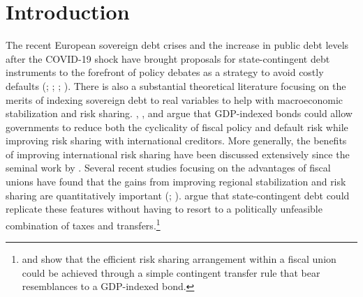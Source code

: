 \ifdefined\ungated
\else
	\def\ungated{1}
\fi

\ifnum{}%
\else
  \section{Introduction}
\fi

The recent European sovereign debt crises and the increase in public debt levels after the COVID-19 shock have brought proposals for state-contingent debt instruments to the forefront of policy debates as a strategy to avoid costly defaults (\citealp{UN2006}; \citealp{Blanchard2016}; \citealp{IMFpolicy2017}; \citealp{IMF2020}). There is also a substantial theoretical literature focusing on the merits of indexing sovereign debt to real variables to help with macroeconomic stabilization and risk sharing. \cite{Shillerbook}, \cite{HMindexed2012}, \citet*{voxeubook} and \cite{KimOstry2021} argue that GDP-indexed bonds could allow governments to reduce both the cyclicality of fiscal policy and default risk while improving risk sharing with international creditors. More generally, the benefits of improving international risk sharing have been discussed extensively since the seminal work by \cite{BackusKehoeKydland92}. Several recent studies focusing on the advantages of fiscal unions have found that the gains from improving regional stabilization and risk sharing are quantitatively important (\citealp{Beraja2020}; \citealp{FarhiWerning2017}). \cite{ObstfeldPeri1998} argue that state-contingent debt could replicate these features without having to resort to a politically unfeasible combination of taxes and transfers.\footnote{\cite{Beraja2020} and \cite{FarhiWerning2017} show that the efficient risk sharing arrangement within a fiscal union could be achieved through a simple contingent transfer rule that bear resemblances to a GDP-indexed bond.}

